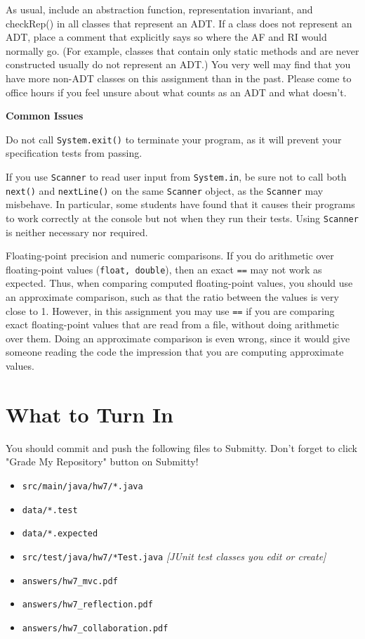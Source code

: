 \documentclass[11pt]{article}
\begin{document}
\noindent As usual, include an abstraction function, representation invariant, and checkRep() in all classes that represent an ADT. If a class does not represent an ADT, place a comment that explicitly says so where the AF and RI would normally go. (For example, classes that contain only static methods and are never constructed usually do not represent an ADT.) You very well may find that you have more non-ADT classes on this assignment than in the past. Please come to office hours if you feel unsure about what counts as an ADT and what doesn't.
\newpage

\noindent \large{\textbf{Common Issues}}

\noindent Do not call \texttt{System.exit()} to terminate your program, as it will prevent your specification tests from passing.

\noindent If you use \texttt{Scanner} to read user input from \texttt{System.in}, be sure not to call both \texttt{next()} and \texttt{nextLine()} on the same \texttt{Scanner} object, as the \texttt{Scanner} may misbehave. In particular, some students have found that it causes their programs to work correctly at the console but not when they run their tests. Using \texttt{Scanner} is neither necessary nor required.

\noindent Floating-point precision and numeric comparisons. If you do arithmetic over floating-point values (\texttt{float, double}), then an exact \texttt{==} may not work as expected. Thus, when comparing computed floating-point values, you should use an approximate comparison, such as that the ratio between the values is very close to 1. However, in this assignment you may use \texttt{==} if you are comparing exact floating-point values that are read from a file, without doing arithmetic over them. Doing an approximate comparison is even wrong, since it would give someone reading the code the impression that you are computing approximate values.

\section*{What to Turn In}
You should commit and push the following files to Submitty. Don't forget to click "Grade My Repository" button on Submitty!
\begin{itemize}
\item \texttt{src/main/java/hw7/*.java}
\item \texttt{data/*.test}
\item \texttt{data/*.expected}
\item \texttt{src/test/java/hw7/*Test.java} \textit{[JUnit test classes you edit or create]}
\item \texttt{answers/hw7\_mvc.pdf}
\item \texttt{answers/hw7\_reflection.pdf}
\item \texttt{answers/hw7\_collaboration.pdf}
\end{itemize}
\end{document}
